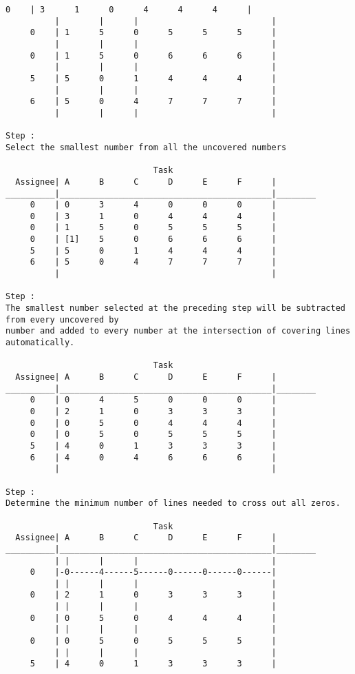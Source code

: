 \documentclass[titlepage, letterpaper]{article}
\begin{document}
\begin{lstlisting}[basicstyle=\tiny]
     0    | 3      1      0      4      4      4      |
          |        |      |                           |
     0    | 1      5      0      5      5      5      |
          |        |      |                           |
     0    | 1      5      0      6      6      6      |
          |        |      |                           |
     5    | 5      0      1      4      4      4      |
          |        |      |                           |
     6    | 5      0      4      7      7      7      |
          |        |      |                           |

Step :
Select the smallest number from all the uncovered numbers

                              Task
  Assignee| A      B      C      D      E      F      |
__________|___________________________________________|________
     0    | 0      3      4      0      0      0      | 
     0    | 3      1      0      4      4      4      | 
     0    | 1      5      0      5      5      5      | 
     0    | [1]    5      0      6      6      6      | 
     5    | 5      0      1      4      4      4      | 
     6    | 5      0      4      7      7      7      | 
          |                                           | 

Step :
The smallest number selected at the preceding step will be subtracted from every uncovered by 
number and added to every number at the intersection of covering lines automatically. 

                              Task
  Assignee| A      B      C      D      E      F      |
__________|___________________________________________|________
     0    | 0      4      5      0      0      0      | 
     0    | 2      1      0      3      3      3      | 
     0    | 0      5      0      4      4      4      | 
     0    | 0      5      0      5      5      5      | 
     5    | 4      0      1      3      3      3      | 
     6    | 4      0      4      6      6      6      | 
          |                                           | 

Step :
Determine the minimum number of lines needed to cross out all zeros.

                              Task
  Assignee| A      B      C      D      E      F      |
__________|___________________________________________|________
          | |      |      |                           |
     0    |-0------4------5------0------0------0------|
          | |      |      |                           |
     0    | 2      1      0      3      3      3      |
          | |      |      |                           |
     0    | 0      5      0      4      4      4      |
          | |      |      |                           |
     0    | 0      5      0      5      5      5      |
          | |      |      |                           |
     5    | 4      0      1      3      3      3      |



\end{lstlisting}
\end{document}
